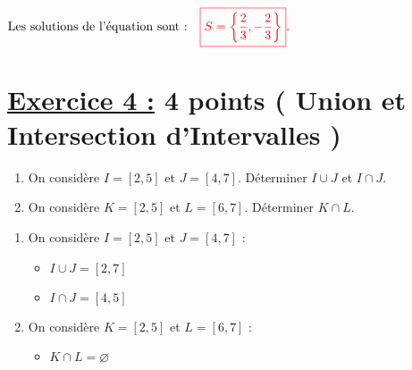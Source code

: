 \documentclass[12pt,a4paper]{article}
\begin{document}
\(
\text{Les solutions de l'équation sont :} \quad
\textcolor{red}{\boxed{S=\left\lbrace  \frac{2}{3},-\frac{2}{3} \right\rbrace }}.
\)


\section*{\underline{Exercice 4 :} 4 points ( Union et Intersection d'Intervalles )}  

\begin{enumerate}  
\item On considère \( I = [2, 5] \) et \( J = [4, 7] \). Déterminer \( I \cup J \) et \( I \cap J \).  

\item On considère \( K = [2, 5] \) et \( L = [6, 7] \). Déterminer \( K \cap L \).  
\end{enumerate}

\begin{enumerate}
    \item On considère $I = [2, 5]$ et $J = [4, 7]$ :
    \begin{itemize}
        \item $I \cup J = [2, 7]$
        \item $I \cap J = [4, 5]$
    \end{itemize}

    \item On considère $K = [2, 5]$ et $L = [6, 7]$ :
    \begin{itemize}
        \item $K \cap L = \varnothing$
    \end{itemize}
\end{enumerate}
\end{document}
